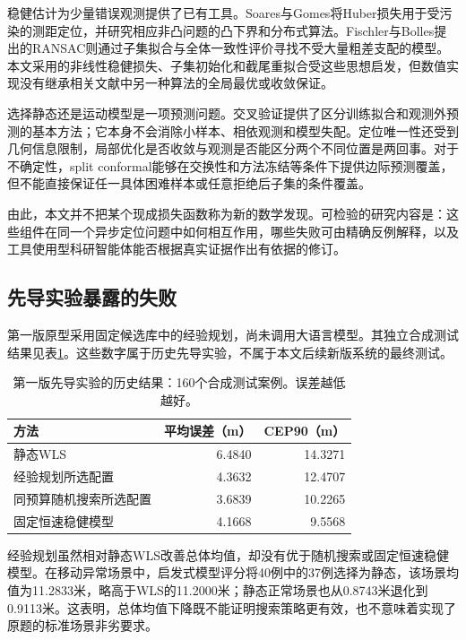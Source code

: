 稳健估计为少量错误观测提供了已有工具。Soares与Gomes将Huber损失用于受污染的测距定位，并研究相应非凸问题的凸下界和分布式算法\cite{soares2016badapples}。Fischler与Bolles提出的RANSAC则通过子集拟合与全体一致性评价寻找不受大量粗差支配的模型\cite{fischler1981random}。本文采用的非线性稳健损失、子集初始化和截尾重拟合受这些思想启发，但数值实现没有继承相关文献中另一种算法的全局最优或收敛保证。

选择静态还是运动模型是一项预测问题。交叉验证提供了区分训练拟合和观测外预测的基本方法\cite{stone1974crossvalidatory}；它本身不会消除小样本、相依观测和模型失配。定位唯一性还受到几何信息限制，局部优化是否收敛与观测是否能区分两个不同位置是两回事\cite{eren2004rigidity}。对于不确定性，split conformal能够在交换性和方法冻结等条件下提供边际预测覆盖\cite{lei2018distributionfree}，但不能直接保证任一具体困难样本或任意拒绝后子集的条件覆盖。

由此，本文并不把某个现成损失函数称为新的数学发现。可检验的研究内容是：这些组件在同一个异步定位问题中如何相互作用，哪些失败可由精确反例解释，以及工具使用型科研智能体能否根据真实证据作出有依据的修订。

\subsection{先导实验暴露的失败}

第一版原型采用固定候选库中的经验规划，尚未调用大语言模型。其独立合成测试结果见表\ref{tab:pilot-failure}。这些数字属于历史先导实验，不属于本文后续新版系统的最终测试。

\begin{table}[tbp]
  \centering
  \caption{第一版先导实验的历史结果：160个合成测试案例。误差越低越好。}
  \label{tab:pilot-failure}
  \begin{tabular}{lrr}
    \toprule
    方法 & 平均误差（m） & CEP90（m）\\
    \midrule
    静态WLS & 6.4840 & 14.3271\\
    经验规划所选配置 & 4.3632 & 12.4707\\
    同预算随机搜索所选配置 & 3.6839 & 10.2265\\
    固定恒速稳健模型 & 4.1668 & 9.5568\\
    \bottomrule
  \end{tabular}
\end{table}

经验规划虽然相对静态WLS改善总体均值，却没有优于随机搜索或固定恒速稳健模型。在移动异常场景中，启发式模型评分将40例中的37例选择为静态，该场景均值为11.2833米，略高于WLS的11.2000米；静态正常场景也从0.8743米退化到0.9113米。这表明，总体均值下降既不能证明搜索策略更有效，也不意味着实现了原题的标准场景非劣要求。

